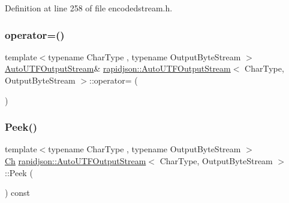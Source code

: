 Definition at line 258 of file encodedstream.\+h.


\begin{DoxyCode}{0}

\end{DoxyCode}
\mbox{\label{classrapidjson_1_1_auto_u_t_f_output_stream_a927efe7efab9ddc47820e4940b554d23}} 
\subsubsection{\texorpdfstring{operator=()}{operator=()}}
{\footnotesize\ttfamily template$<$typename Char\+Type , typename Output\+Byte\+Stream $>$ \\
\mbox{\hyperlink{classrapidjson_1_1_auto_u_t_f_output_stream}{Auto\+U\+T\+F\+Output\+Stream}}\& \mbox{\hyperlink{classrapidjson_1_1_auto_u_t_f_output_stream}{rapidjson\+::\+Auto\+U\+T\+F\+Output\+Stream}}$<$ Char\+Type, Output\+Byte\+Stream $>$\+::operator= (\begin{DoxyParamCaption}\item[{const \mbox{\hyperlink{classrapidjson_1_1_auto_u_t_f_output_stream}{Auto\+U\+T\+F\+Output\+Stream}}$<$ Char\+Type, Output\+Byte\+Stream $>$ \&}]{ }\end{DoxyParamCaption})\hspace{0.3cm}{\ttfamily [private]}}

\mbox{\label{classrapidjson_1_1_auto_u_t_f_output_stream_a89e2fba1e92b4f1408744934fcb56881}} 
\subsubsection{\texorpdfstring{Peek()}{Peek()}}
{\footnotesize\ttfamily template$<$typename Char\+Type , typename Output\+Byte\+Stream $>$ \\
\mbox{\hyperlink{classrapidjson_1_1_auto_u_t_f_output_stream_aaf40884d8f4fbf24ea040d3363c9967e}{Ch}} \mbox{\hyperlink{classrapidjson_1_1_auto_u_t_f_output_stream}{rapidjson\+::\+Auto\+U\+T\+F\+Output\+Stream}}$<$ Char\+Type, Output\+Byte\+Stream $>$\+::Peek (\begin{DoxyParamCaption}{ }\end{DoxyParamCaption}) const}



